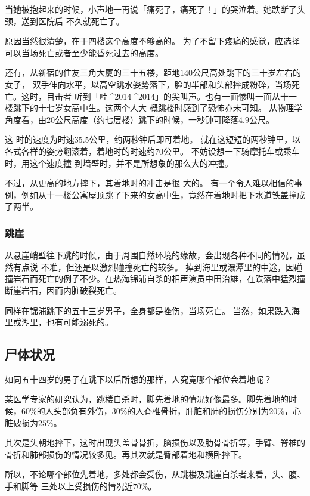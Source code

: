 \documentclass[UTF8]{ctexart}
\begin{document}
当她被抱起来的时候，小声地一再说「痛死了，痛死了！」的哭泣着。她跌断了头颈，送到医院后
不久就死亡了。

原因当然很清楚，在于四楼这个高度不够高的。
为了不留下疼痛的感觉，应选择可以当场死亡或者至少能昏死过去的高度。

还有，从新宿的住友三角大厦的三十五楼，距地$140$公尺高处跳下的三十岁左右的女子， 双手伸向水平，以高空跳水姿势落下，脸的半部和头部摔成粉碎，当场死亡。这时，目击者 听到「哇^^^^2014^^^^2014」的尖叫声。也有一面惨叫一面从十一楼跳下的十七岁女高中生。这两个人大 概跳楼时感到了恐怖亦未可知。 从物理学角度看，由$20$公尺高度（约七层楼）跳下的时候，一秒钟可降落$4.9$公尺。

这 时的速度为时速$35.5$公里，约两秒钟后即可着地。
就在这短短的两秒钟里，以各式各样的姿势翻滚着，着地时的时速约$70$公里。
不妨设想一下骑摩托车或乘车时，用这个速度撞 到墙壁时，并不是所想象的那么大的冲撞。

不过，从更高的地方摔下，其着地时的冲击是很 大的。
有一个令人难以相信的事例，例如从十一楼公寓屋顶跳了下来的女高中生，竟然在着地时把下水道铁盖撞成了两半。

\subsubsection*{跳崖}

从悬崖峭壁往下跳的时候，由于周围自然环境的缘故，会出现各种不同的情况，虽然有点说
不准，但还是以激烈碰撞死亡的较多。
掉到海里或瀑潭里的中途，因碰撞岩石而死亡的例子不少。在热海锦浦自杀的相声演员中田治雄，在跌落中猛烈撞断崖岩石，因而内脏破裂死亡。

同样在锦浦跳下的五十三岁男子，全身都是挫伤，当场死亡。
当然，如果跌入海里或湖里，也有可能溺死的。

\subsection{尸体状况}

如同五十四岁的男子在跳下以后所想的那样，人究竟哪个部位会着地呢？

某医学专家的研究认为，跳楼自杀时，脚先着地的情况好像最多。脚先着地的时候，$60\%$的人头部负有外伤，$30\%$的人脊椎骨折，肝脏和肺的损伤分别为$20\%$，心 脏破损为$25\%$。

其次是头朝地摔下，这时出现头盖骨骨折，脑损伤以及肋骨骨折等，手臂、脊椎的骨折和肺部损伤的情况较多见。再其次就是臀部着地和横卧摔下。

所以，不论哪个部位先着地，多处都会受伤，从跳楼及跳崖自杀者来看，头、腹、手和脚等 三处以上受损伤的情况近$70\%$。
\end{document}

